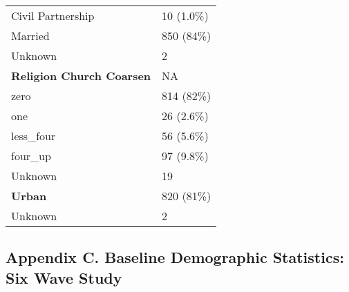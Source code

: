\documentclass[
  single column]{article}
\begin{document}
\begin{longtable}[]{@{}ll@{}}
Civil Partnership & 10 (1.0\%) \\
Married & 850 (84\%) \\
Unknown & 2 \\
\textbf{Religion Church Coarsen} & NA \\
zero & 814 (82\%) \\
one & 26 (2.6\%) \\
less\_four & 56 (5.6\%) \\
four\_up & 97 (9.8\%) \\
Unknown & 19 \\
\textbf{Urban} & 820 (81\%) \\
Unknown & 2 \\

\end{longtable}

\newpage{}

\subsection{Appendix C. Baseline Demographic Statistics: Six Wave
Study}\label{appendix-demographics-long}
\end{document}
